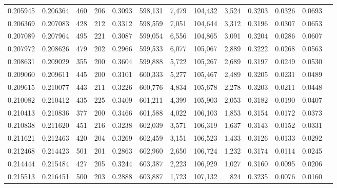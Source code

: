 \begin{tabular}{rrrrrrrrrrrrr}
0.205945 & 0.206364 &   460 & 206 &                                     0.3093 & 598,131 &   7,479 & 104,432 &   3,524 & 0.3203 & 0.0326 & 0.0693 \\
0.206369 & 0.207083 &   428 & 212 &                                     0.3312 & 598,559 &   7,051 & 104,644 &   3,312 & 0.3196 & 0.0307 & 0.0653 \\
0.207089 & 0.207964 &   495 & 221 &                                     0.3087 & 599,054 &   6,556 & 104,865 &   3,091 & 0.3204 & 0.0286 & 0.0607 \\
0.207972 & 0.208626 &   479 & 202 &                                     0.2966 & 599,533 &   6,077 & 105,067 &   2,889 & 0.3222 & 0.0268 & 0.0563 \\
0.208631 & 0.209029 &   355 & 200 &                                     0.3604 & 599,888 &   5,722 & 105,267 &   2,689 & 0.3197 & 0.0249 & 0.0530 \\
0.209060 & 0.209611 &   445 & 200 &                                     0.3101 & 600,333 &   5,277 & 105,467 &   2,489 & 0.3205 & 0.0231 & 0.0489 \\
0.209615 & 0.210077 &   443 & 211 &                                     0.3226 & 600,776 &   4,834 & 105,678 &   2,278 & 0.3203 & 0.0211 & 0.0448 \\
0.210082 & 0.210412 &   435 & 225 &                                     0.3409 & 601,211 &   4,399 & 105,903 &   2,053 & 0.3182 & 0.0190 & 0.0407 \\
0.210413 & 0.210836 &   377 & 200 &                                     0.3466 & 601,588 &   4,022 & 106,103 &   1,853 & 0.3154 & 0.0172 & 0.0373 \\
0.210838 & 0.211620 &   451 & 216 &                                     0.3238 & 602,039 &   3,571 & 106,319 &   1,637 & 0.3143 & 0.0152 & 0.0331 \\
0.211621 & 0.212463 &   420 & 204 &                                     0.3269 & 602,459 &   3,151 & 106,523 &   1,433 & 0.3126 & 0.0133 & 0.0292 \\
0.212468 & 0.214423 &   501 & 201 &                                     0.2863 & 602,960 &   2,650 & 106,724 &   1,232 & 0.3174 & 0.0114 & 0.0245 \\
0.214444 & 0.215484 &   427 & 205 &                                     0.3244 & 603,387 &   2,223 & 106,929 &   1,027 & 0.3160 & 0.0095 & 0.0206 \\
0.215513 & 0.216451 &   500 & 203 &                                     0.2888 & 603,887 &   1,723 & 107,132 &     824 & 0.3235 & 0.0076 & 0.0160 \\

\end{tabular}

